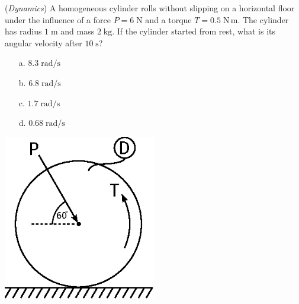\documentclass[addpoints, 12pt]{exam}
\begin{document}
\begin{questions}
\begin{minipage}{0.5\textwidth}
\question(\textit{Dynamics})
A homogeneous cylinder rolls without slipping on a horizontal floor under the 
influence of a force $P = 6 \; \unit{\newton}$ and a torque $T = 0.5 \; 
\unit{\newton\,\meter}$. The cylinder has radius $1 \; \unit{\meter}$ and mass 
$2 \; \unit{\kilo\gram}$. If the cylinder started from rest, what is its angular
velocity after $10 \; \unit{\second}$? \\[0.5ex]

\begin{minipage}{0.45\textwidth}
    \begin{center}
    \begin{itemize}
        \setlength\itemsep{-0.4em}
        \item[a.] $8.3 \; \unit{\radian\per\second}$
        \item[b.] $6.8 \; \unit{\radian\per\second}$
    \end{itemize}
    \end{center}
\end{minipage}
\begin{minipage}{0.45\textwidth}
    \begin{center}
    \begin{itemize}
        \setlength\itemsep{-0.4em}
        \item[c.] $1.7 \; \unit{\radian\per\second}$
        \item[d.] $0.68 \; \unit{\radian\per\second}$
    \end{itemize}
    \end{center}
\end{minipage}

\end{minipage}
%
\begin{minipage}{0.5\textwidth}
    \centering
    \includegraphics[width=0.5\textwidth,valign=c]{./figures/question6.eps}
\end{minipage}



\end{questions}
\end{document}
